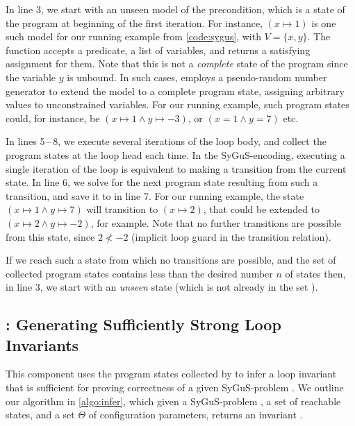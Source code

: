 \documentclass[conference]{IEEEtran}
\begin{document}
In line 3, we start with an unseen model of the precondition,
which is a state of the program at beginning of the first iteration.
For instance, $(x \mapsto 1)$ is one such model for our running example from \cref{code:sygus}, with $V = \{x, y\}$.
The \GetModel function accepts a predicate, a list of variables,
and returns a satisfying assignment for them.
Note that this is not a \emph{complete} state of the program since the variable $y$ is unbound.
In such cases, \GetModel employs a pseudo-random number generator to extend the model to a complete program state,
assigning arbitrary values to unconstrained variables.
For our running example, such program states could, for instance,
be $(x \mapsto 1 \wedge y \mapsto -3)$, or $(x = 1 \wedge y = 7)$ etc.

In lines 5\,--\,8, we execute several iterations of the loop body, and collect the program states at the loop head each time.
In the SyGuS-\INV encoding, executing a single iteration of the loop is equivalent to making a transition from the current state.
In line 6, we solve for the next program state resulting from such a transition, and save it to \States in line 7.
For our running example, the state $(x \mapsto 1 \wedge y \mapsto 7)$ will transition to $(x \mapsto 2)$,
that could be extended to $(x \mapsto 2 \wedge y \mapsto -2)$, for example.
Note that no further transitions are possible from this state,
since $2 \not< -2$ (implicit loop guard in the transition relation).

If we reach such a state from which no transitions are possible,
and the set \States of collected program states contains less than the desired number $n$ of states then, in line 3,
we start with an \emph{unseen} state (which is not already in the set \States).




\subsection{\Infer: Generating Sufficiently Strong Loop Invariants} \label{subsec:Infer}

\noindent
This component uses the program states collected by \Record to infer a loop invariant that is sufficient
for proving correctness of a given SyGuS-\INV problem \SyGuSINVQuadruplet.
We outline our \Infer algorithm in \cref{algo:infer}, which given a SyGuS-\INV problem \SyGuSINVQuadruplet,
a set \States of reachable states, and a set $\Theta$ of configuration parameters,
returns an invariant \Inv.
\end{document}
